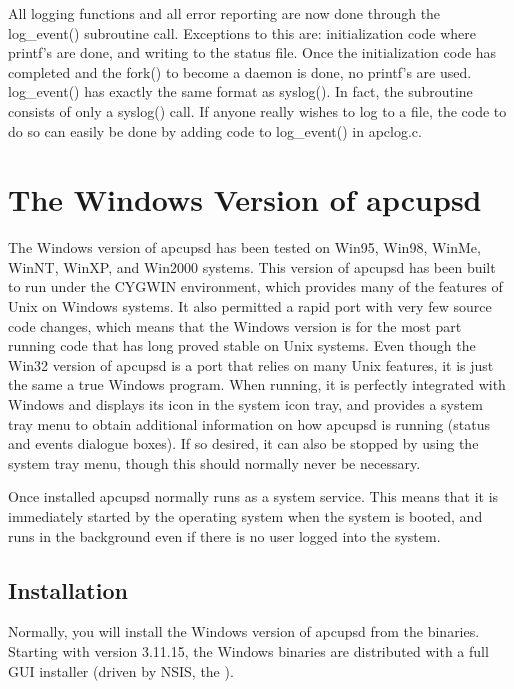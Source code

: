 {{{{{{{\label{index-Developers-Notes-169}
All logging functions and all error reporting are now done through the
log\_event() subroutine call. Exceptions to this are: initialization code
where printf's are done, and writing to the status file. Once the
initialization code has completed and the fork() to become a daemon is done,
no printf's are used. log\_event() has exactly the same format as syslog(). In
fact, the subroutine consists of only a syslog() call. If anyone really wishes
to log to a file, the code to do so can easily be done by adding code to
log\_event() in apclog.c. 


\section*{The Windows Version of apcupsd}
\label{The-Windows-Version-of-apcupsd}

The Windows version of apcupsd has been tested on Win95, Win98, WinMe, WinNT,
WinXP, and Win2000 systems. This version of apcupsd has been built to run
under the CYGWIN environment, which provides many of the features of Unix on
Windows systems. It also permitted a rapid port with very few source code
changes, which means that the Windows version is for the most part running
code that has long proved stable on Unix systems. Even though the Win32
version of apcupsd is a port that relies on many Unix features, it is just the
same a true Windows program. When running, it is perfectly integrated with
Windows and displays its icon in the system icon tray, and provides a system
tray menu to obtain additional information on how apcupsd is running (status
and events dialogue boxes). If so desired, it can also be stopped by using the
system tray menu, though this should normally never be necessary.  

Once installed apcupsd normally runs as a system service.  This means that it
is immediately started by the operating system when the system is booted, and
runs in the background even if there is no user logged into the system. 

\label{Installation}
\subsection*{Installation}

Normally, you will install the Windows version of apcupsd from the binaries.
Starting with version 3.11.15, the Windows binaries are distributed with
a full GUI installer (driven by NSIS, the 
).

}}}}}}}
